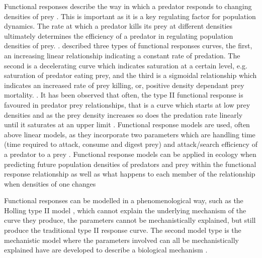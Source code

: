 \documentclass[11pt]{article}
\begin{document}
	
Functional responses describe the way in which a predator responds to changing densities of prey \cite{Holling1959}. This is important as it is a key regulating factor for population dynamics. The rate at which a predator kills its prey at different densities ultimately determines the efficiency of a predator in regulating population densities of prey. \cite{Murdoch1975}. \cite{Holling1959} described three types of functional responses curves, the first, an increasing linear relationship indicating a constant rate of predation. The second is a decelerating curve which indicates saturation at a certain level, e.g. saturation of predator eating prey, and the third is a sigmoidal relationship which indicates an increased rate of prey killing, or, positive density dependant prey mortality. \cite{Pervez2005}. It has been observed that often, the type II functional response is favoured in predator prey relationships, that is a curve which starts at low prey densities and as the prey density increases so does the predation rate linearly until it saturates at an upper limit \cite{Jeschke2002}. Functional response models are used, often above linear models, as they incorporate two parameters which are handling time (time required to attack, consume and digest prey) and attack/search efficiency of a predator to a prey \cite{Fathipour2016}. Functional response models can be applied in ecology when predicting future population densities of predators and prey within the functional response relationship as well as what happens to each member of the relationship when densities of one changes \cite{Jeschke2002}

Functional responses can be modelled in a phenomenological way, such as the Holling type II model \cite{Holling1959}, which cannot explain the underlying mechanism of the curve they produce, the parameters cannot be mechanistically explained, but still produce the traditional type II response curve. The second model type is the mechanistic model where the parameters involved can all be mechanistically explained have are developed to describe a biological mechanism \cite{Jeschke2002}.
\end{document}
